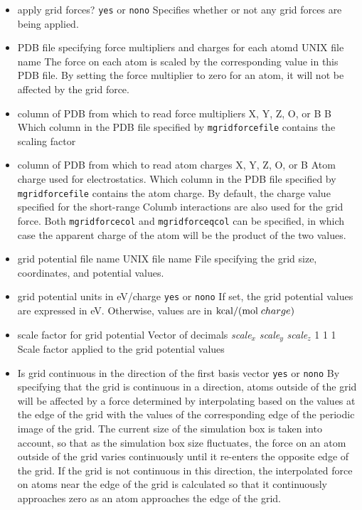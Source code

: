 \begin{itemize}

\item
{}
{apply grid forces?}
{{\tt yes} or {\tt no}}{{\tt no}}
{Specifies whether or not any grid forces are being applied.}

\item
{}
{PDB file specifying force multipliers and charges for each atomd}
{UNIX file name}
{The force on each atom is scaled by the corresponding value in this PDB file. By setting the force multiplier to zero for an atom, it will not be affected by the grid force. }

\item
{}
{column of PDB from which to read force multipliers}
{X, Y, Z, O, or B}
{B}
{Which column in the PDB file specified by {\tt mgridforcefile} contains the scaling factor}

\item
{}
{column of PDB from which to read atom charges}
{X, Y, Z, O, or B}
{Atom charge used for electrostatics.} 
{Which column in the PDB file specified by {\tt mgridforcefile} contains the atom charge. By default, the charge value specified for the short-range Columb interactions are also used for the grid force. Both {\tt mgridforcecol} and {\tt mgridforceqcol} can be specified, in which case the apparent charge of the atom will be the product of the two values.}

\item
{}
{grid potential file name}
{UNIX file name}
{File specifying the grid size, coordinates, and potential values.}

\item
{}
{grid potential units in eV/charge}
{{\tt yes} or {\tt no}}{{\tt no}}
{If set, the grid potential values are expressed in {\rm eV}. Otherwise, values are
in ${\rm kcal} / ({\rm mol} \; charge)$}

\item
{}
{scale factor for grid potential}
{Vector of decimals {\it scale}$_x$ {\it scale}$_y$ {\it scale}$_z$ }
{1 1 1}
{Scale factor applied to the grid potential values}

\item
{}
{Is grid continuous in the direction of the first basis vector}
{{\tt yes} or {\tt no}}{{\tt no}}
{By specifying that the grid is continuous in a direction, atoms outside of the grid will be affected by a force determined by interpolating based on the values at the edge of the grid with the values of the corresponding edge of the periodic image of the grid. The current size of the simulation box is taken into account, so that as the simulation box size fluctuates, the force on an atom outside of the grid varies continuously until it re-enters the opposite edge of the grid. If the grid is not continuous in this direction, the interpolated force on atoms near the edge of the grid is calculated so that it continuously approaches zero as an atom approaches the edge of the grid.}


\end{itemize}
